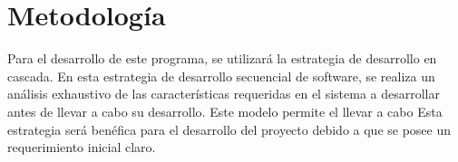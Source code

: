 \section{Metodología}

Para el desarrollo de este programa, se utilizará la estrategia de desarrollo en cascada. En esta estrategia de desarrollo secuencial de software, se realiza un análisis exhaustivo de las características requeridas en el sistema a desarrollar antes de llevar a cabo su desarrollo. Este modelo permite el llevar a cabo Esta estrategia será benéfica para el desarrollo del proyecto debido a que se posee un requerimiento inicial claro.\cite{Balaji2012WATEERFALLV}
